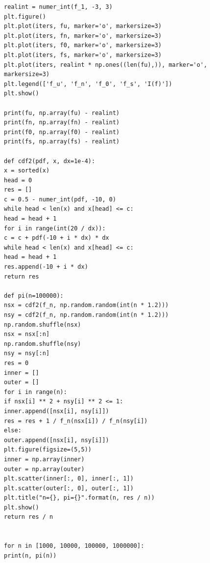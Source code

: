\documentclass[a4paper]{IEEEtran}
\begin{document}
\begin{lstlisting}
realint = numer_int(f_1, -3, 3)
plt.figure()
plt.plot(iters, fu, marker='o', markersize=3)
plt.plot(iters, fn, marker='o', markersize=3)
plt.plot(iters, f0, marker='o', markersize=3)
plt.plot(iters, fs, marker='o', markersize=3)
plt.plot(iters, realint * np.ones((len(fu),)), marker='o', markersize=3)
plt.legend(['f_u', 'f_n', 'f_0', 'f_s', 'I(f)'])
plt.show()

print(fu, np.array(fu) - realint)
print(fn, np.array(fn) - realint)
print(f0, np.array(f0) - realint)
print(fs, np.array(fs) - realint)

def cdf2(pdf, x, dx=1e-4):
x = sorted(x)
head = 0
res = []
c = 0.5 - numer_int(pdf, -10, 0)
while head < len(x) and x[head] <= c:
head = head + 1
for i in range(int(20 / dx)):
c = c + pdf(-10 + i * dx) * dx
while head < len(x) and x[head] <= c:
head = head + 1
res.append(-10 + i * dx)
return res

def pi(n=100000):
nsx = cdf2(f_n, np.random.random(int(n * 1.2)))
nsy = cdf2(f_n, np.random.random(int(n * 1.2)))
np.random.shuffle(nsx)
nsx = nsx[:n]
np.random.shuffle(nsy)
nsy = nsy[:n]
res = 0
inner = []
outer = []
for i in range(n):
if nsx[i] ** 2 + nsy[i] ** 2 <= 1:
inner.append([nsx[i], nsy[i]])
res = res + 1 / f_n(nsx[i]) / f_n(nsy[i])
else:
outer.append([nsx[i], nsy[i]])
plt.figure(figsize=(5,5))
inner = np.array(inner)
outer = np.array(outer)
plt.scatter(inner[:, 0], inner[:, 1])
plt.scatter(outer[:, 0], outer[:, 1])
plt.title("n={}, pi={}".format(n, res / n))
plt.show()
return res / n


for n in [1000, 10000, 100000, 1000000]:
print(n, pi(n))

	\end{lstlisting}
\end{document}

